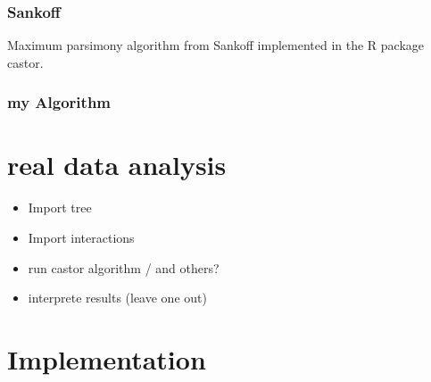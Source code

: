       \subsubsection{Sankoff}
        Maximum parsimony algorithm from Sankoff implemented in the R package castor.

      \subsubsection{my Algorithm}

  \section{real data analysis}
    \begin{itemize}
      \item Import tree
      \item Import interactions
      \item run castor algorithm / and others?
      \item interprete results (leave one out)
    \end{itemize}

  \section{Implementation}

